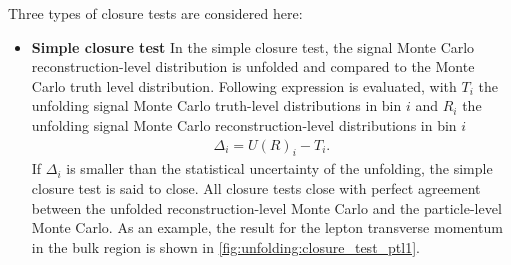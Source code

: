 Three types of closure tests are considered here:
\begin{itemize}
     \item \textbf{Simple closure test} In the simple closure test, the signal Monte Carlo reconstruction-level distribution is unfolded and compared to the Monte Carlo truth level distribution.
      Following expression is evaluated, with \(T_i\) the unfolding signal Monte Carlo truth-level distributions in bin \(i\) and
      \(R_i\) the unfolding signal Monte Carlo reconstruction-level distributions in bin \(i\)
      \begin{align*}
        \Delta_i = {U(R)}_i - T_i.
      \end{align*}
      If \(\Delta_i\) is smaller than the statistical uncertainty of the unfolding, the simple closure test is said to close.
      All closure tests close with perfect agreement between the unfolded reconstruction-level Monte Carlo and the particle-level Monte Carlo. As an example, the result for the lepton transverse momentum in the bulk region is shown in \cref{fig:unfolding:closure_test_ptl1}.
      
\end{itemize}

